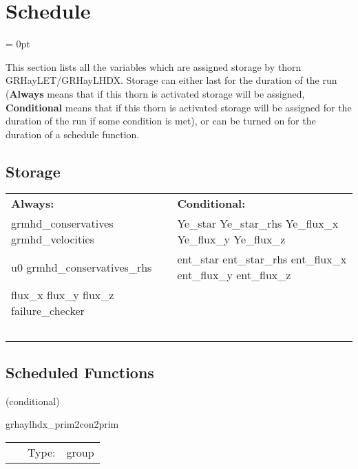 
\section{Schedule} 


\parskip = 0pt


\noindent This section lists all the variables which are assigned storage by thorn GRHayLET/GRHayLHDX.  Storage can either last for the duration of the run ({\bf Always} means that if this thorn is activated storage will be assigned, {\bf Conditional} means that if this thorn is activated storage will be assigned for the duration of the run if some condition is met), or can be turned on for the duration of a schedule function.


\subsection*{Storage}

\hspace{5mm}

 \begin{tabular*}{160mm}{ll} 

{\bf Always:}& {\bf Conditional:} \\ 
 grmhd\_conservatives grmhd\_velocities &  Ye\_star Ye\_star\_rhs Ye\_flux\_x Ye\_flux\_y Ye\_flux\_z\\ 
 u0 grmhd\_conservatives\_rhs &  ent\_star ent\_star\_rhs ent\_flux\_x ent\_flux\_y ent\_flux\_z\\ 
 flux\_x flux\_y flux\_z failure\_checker & ~\\ 
~ & ~\\ 
\end{tabular*} 


\subsection*{Scheduled Functions}
\vspace{5mm}

   (conditional) 

\hspace{5mm} grhaylhdx\_prim2con2prim 

\hspace{5mm}{\it initialize grhaylhdx variables using hydrobasex initial data } 


\hspace{5mm}

 \begin{tabular*}{160mm}{cll} 
~ & Type:  & group \\ 
\end{tabular*} 



